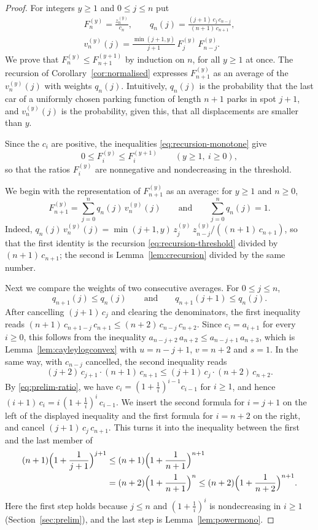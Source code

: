 \documentclass{amsart}
\theoremstyle{definition}
\theoremstyle{remark}
\numberwithin{equation}{section}
\begin{document}
\begin{proof}
For integers $y\ge 1$ and $0\le j\le n$ put
\[
\begin{gathered}
F^{(y)}_n=\frac{z^{(y)}_n}{c_n},\qquad
q_n(j)=\frac{(j+1)\,c_j\,c_{n-j}}{(n+1)\,c_{n+1}},\\
v^{(y)}_n(j)=\frac{\min(j+1,y)}{j+1}\,F^{(y)}_j\,F^{(y)}_{n-j}.
\end{gathered}
\]
We prove that $F^{(y)}_n\le F^{(y+1)}_{n+1}$ by induction on $n$, for all $y\ge 1$ at once. The recursion of Corollary~\ref{cor:normalised} expresses $F^{(y)}_{n+1}$ as an average of the $v^{(y)}_n(j)$ with weights $q_n(j)$. Intuitively, $q_n(j)$ is the probability that the last car of a uniformly chosen parking function of length $n+1$ parks in spot $j+1$, and $v^{(y)}_n(j)$ is the probability, given this, that all displacements are smaller than $y$.

Since the $c_i$ are positive, the inequalities \eqref{eq:recursion-monotone} give
\[
0\le F^{(y)}_i\le F^{(y+1)}_i\qquad(y\ge 1,\ i\ge 0),
\]
so that the ratios $F^{(y)}_i$ are nonnegative and nondecreasing in the threshold.

We begin with the representation of $F^{(y)}_{n+1}$ as an average: for $y\ge 1$ and $n\ge 0$,
\[
F^{(y)}_{n+1}=\sum_{j=0}^{n}q_n(j)\,v^{(y)}_n(j)\qquad\text{and}\qquad\sum_{j=0}^{n}q_n(j)=1.
\]
Indeed, $q_n(j)\,v^{(y)}_n(j)=\min(j+1,y)\,z^{(y)}_j\,z^{(y)}_{n-j}/((n+1)\,c_{n+1})$, so that the first identity is the recursion \eqref{eq:recursion-threshold} divided by $(n+1)\,c_{n+1}$; the second is Lemma~\ref{lem:crecursion} divided by the same number.

Next we compare the weights of two consecutive averages. For $0\le j\le n$,
\[
q_{n+1}(j)\le q_n(j)\qquad\text{and}\qquad q_{n+1}(j+1)\le q_n(j).
\]
After cancelling $(j+1)\,c_j$ and clearing the denominators, the first inequality reads $(n+1)\,c_{n+1-j}\,c_{n+1}\le(n+2)\,c_{n-j}\,c_{n+2}$. Since $c_i=a_{i+1}$ for every $i\ge 0$, this follows from the inequality $a_{n-j+2}\,a_{n+2}\le a_{n-j+1}\,a_{n+3}$, which is Lemma~\ref{lem:cayleylogconvex} with $u=n-j+1$, $v=n+2$ and $s=1$. In the same way, with $c_{n-j}$ cancelled, the second inequality reads
\[
(j+2)\,c_{j+1}\cdot(n+1)\,c_{n+1}\le(j+1)\,c_j\cdot(n+2)\,c_{n+2}.
\]
By \eqref{eq:prelim-ratio}, we have $c_i=(1+\frac1i)^{i-1}c_{i-1}$ for $i\ge 1$, and hence $(i+1)\,c_i=i\,(1+\frac1i)^{i}\,c_{i-1}$. We insert the second formula for $i=j+1$ on the left of the displayed inequality and the first formula for $i=n+2$ on the right, and cancel $(j+1)\,c_j\,c_{n+1}$. This turns it into the inequality between the first and the last member of
\begin{align*}
(n+1)\Bigl(1+\frac{1}{j+1}\Bigr)^{j+1}
&\le(n+1)\Bigl(1+\frac{1}{n+1}\Bigr)^{n+1}\\
&=(n+2)\Bigl(1+\frac{1}{n+1}\Bigr)^{n}
\le(n+2)\Bigl(1+\frac{1}{n+2}\Bigr)^{n+1}.
\end{align*}
Here the first step holds because $j\le n$ and $(1+\frac1i)^i$ is nondecreasing in $i\ge 1$ (Section~\ref{sec:prelim}), and the last step is Lemma~\ref{lem:powermono}.


\end{proof}
\end{document}
